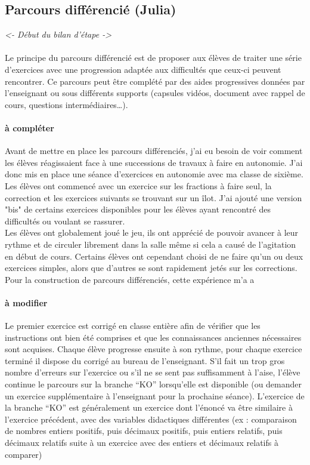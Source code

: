 \subsection{Parcours différencié (Julia)}

\textit{<- Début du bilan d'étape ->}
\paragraph{}
Le principe du parcours différencié est de proposer aux élèves de traiter une série d'exercices avec une progression adaptée aux difficultés que ceux-ci peuvent rencontrer. Ce parcours peut être complété par des aides progressives données par l'enseignant ou sous différents supports (capsules vidéos, document avec rappel de cours, questions intermédiaires\ldots ).
\paragraph{à compléter}
Avant de mettre en place les parcours différenciés, j'ai eu besoin de voir comment les élèves réagissaient face à une successions de travaux à faire en autonomie. J'ai donc mis en place une séance d'exercices en autonomie avec ma classe de sixième. \\
Les élèves ont commencé avec un exercice sur les fractions à faire seul, la correction et les exercices suivants se trouvant sur un îlot. J'ai ajouté une version "bis" de certains exercices disponibles pour les élèves ayant rencontré des difficultés ou voulant se rassurer. \\
Les élèves ont globalement joué le jeu, ils ont apprécié de pouvoir avancer à leur  rythme et de circuler librement dans la salle même si cela a causé de l'agitation en début de cours. Certains élèves ont cependant choisi de ne faire qu'un ou deux exercices simples, alors que d'autres se sont rapidement jetés sur les corrections.\\
Pour la construction de parcours différenciés, cette expérience m'a a

\paragraph{à modifier}
Le premier exercice est corrigé en classe entière afin de vérifier que les instructions ont bien été comprises et que les connaissances anciennes nécessaires sont acquises. Chaque élève progresse ensuite à son rythme, pour chaque exercice terminé il dispose du corrigé au bureau de l’enseignant. S’il fait un trop gros nombre d’erreurs sur l’exercice ou s’il ne se sent pas suffisamment à l’aise, l’élève continue le parcours sur la branche “KO” lorsqu’elle est disponible (ou demander un exercice supplémentaire à l’enseignant pour la prochaine séance). L’exercice de la branche “KO” est généralement un exercice dont l’énoncé va être similaire à l’exercice précédent, avec des variables didactiques différentes (ex : comparaison de nombres entiers positifs, puis décimaux positifs, puis entiers relatifs, puis décimaux relatifs suite à un exercice avec des entiers et décimaux relatifs à comparer)

